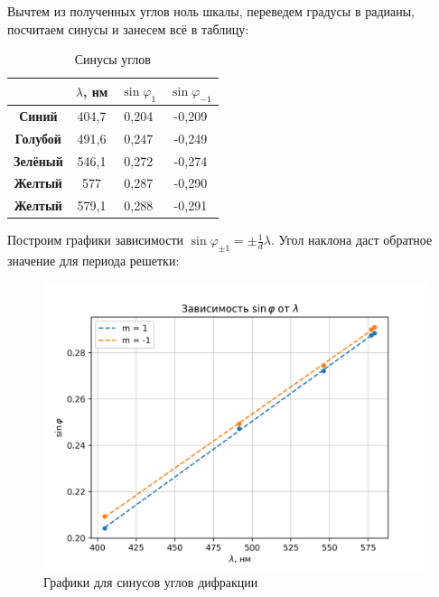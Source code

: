 \documentclass[a4paper, 12pt]{article}
\begin{document}
Вычтем из полученных углов ноль шкалы, переведем градусы в радианы, посчитаем синусы и занесем всё в таблицу:

\begin{table}[H]
	\centering
	\begin{tabular}{|c|c|c|c|}
	\hline
					 & \textbf{$\lambda$, нм} & \textbf{$\sin \varphi_1$} & \textbf{$\sin \varphi_{-1}$} \\ \hline
	\textbf{Синий}   & 404,7                  & 0,204                      & -0,209                        \\ \hline
	\textbf{Голубой} & 491,6                  & 0,247                      & -0,249                        \\ \hline
	\textbf{Зелёный} & 546,1                  & 0,272                      & -0,274                        \\ \hline
	\textbf{Желтый}  & 577                    & 0,287                      & -0,290                        \\ \hline
	\textbf{Желтый}  & 579,1                  & 0,288                      & -0,291                        \\ \hline
	\end{tabular}
	\caption{Синусы углов}
	\label{tab:data_2}
\end{table}

Построим графики зависимости $\sin \varphi_{\pm 1} = \pm \frac{1}{d} \lambda$. Угол наклона даст обратное значение для периода решетки:

\begin{figure}[H]
    \centering
    \includegraphics[width=1\textwidth]{plot1.png}
    \caption{Графики для синусов углов дифракции}
    \label{fig:plot1}
\end{figure}
\end{document}
